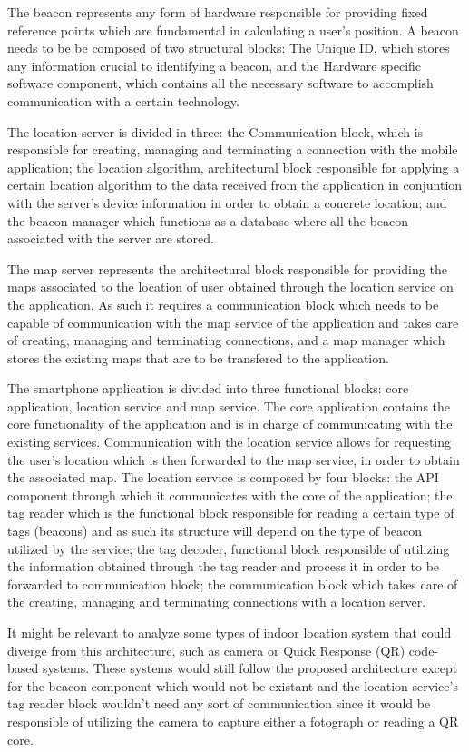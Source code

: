 \documentclass[a4paper]{IEEEtran}
\begin{document}
The beacon represents any form of hardware responsible for providing fixed reference points which are fundamental in calculating a user's position. A beacon needs to be be composed of two structural blocks: The Unique ID, which stores any information crucial to identifying a beacon, and the Hardware specific software component, which contains all the necessary software to accomplish communication with a certain technology. 

The location server is divided in three: the Communication block, which is responsible for creating, managing and terminating a connection with the mobile application; the location algorithm, architectural block responsible for applying a certain location algorithm to the data received from the application in conjuntion with the server's device information in order to obtain a concrete location; and the beacon manager which functions as a database where all the beacon associated with the server are stored.

The map server represents the architectural block responsible for providing the maps associated to the location of user obtained through the location service on the application. As such it requires a communication block which needs to be capable of communication with the map service of the application and takes care of creating, managing and terminating connections, and a map manager which stores the existing maps that are to be transfered to the application.

The smartphone application is divided into three functional blocks: core application, location service and map service. The core application contains the core functionality of the application and is in charge of communicating with the existing services. Communication with the location service allows for requesting the user's location which is then forwarded to the map service, in order to obtain the associated map. The location service is composed by four blocks: the API component through which it communicates with the core of the application; the tag reader which is the functional block responsible for reading a certain type of tags (beacons) and as such its structure will depend on the type of beacon utilized by the service; the tag decoder, functional block responsible of utilizing the information obtained through the tag reader and process it in order to be forwarded to communication block; the communication block which takes care of the creating, managing and terminating connections with a location server.

It might be relevant to analyze some types of indoor location system that could diverge from this architecture, such as camera or Quick Response (QR) code-based systems. These systems would still follow the proposed architecture except for the beacon component which would not be existant and the location service's tag reader block wouldn't need any sort of communication since it would be responsible of utilizing the camera to capture either a fotograph or reading a QR core.
\end{document}
